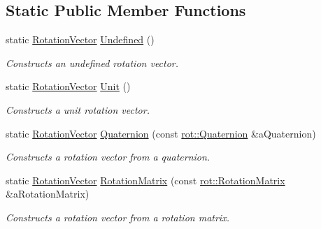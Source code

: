 \subsection*{Static Public Member Functions}
\begin{DoxyCompactItemize}
\item 
static \hyperlink{classlibrary_1_1math_1_1geom_1_1trf_1_1rot_1_1_rotation_vector}{Rotation\+Vector} \hyperlink{classlibrary_1_1math_1_1geom_1_1trf_1_1rot_1_1_rotation_vector_a2641dcca56e633f5639bbcb9dcb02fa2}{Undefined} ()
\begin{DoxyCompactList}\small\item\em Constructs an undefined rotation vector. \end{DoxyCompactList}\item 
static \hyperlink{classlibrary_1_1math_1_1geom_1_1trf_1_1rot_1_1_rotation_vector}{Rotation\+Vector} \hyperlink{classlibrary_1_1math_1_1geom_1_1trf_1_1rot_1_1_rotation_vector_a6dd13d867fa6080a5d45be164ce30c9b}{Unit} ()
\begin{DoxyCompactList}\small\item\em Constructs a unit rotation vector. \end{DoxyCompactList}\item 
static \hyperlink{classlibrary_1_1math_1_1geom_1_1trf_1_1rot_1_1_rotation_vector}{Rotation\+Vector} \hyperlink{classlibrary_1_1math_1_1geom_1_1trf_1_1rot_1_1_rotation_vector_a63ba12aac718671383516a0adab25aec}{Quaternion} (const \hyperlink{classlibrary_1_1math_1_1geom_1_1trf_1_1rot_1_1_quaternion}{rot\+::\+Quaternion} \&a\+Quaternion)
\begin{DoxyCompactList}\small\item\em Constructs a rotation vector from a quaternion. \end{DoxyCompactList}\item 
static \hyperlink{classlibrary_1_1math_1_1geom_1_1trf_1_1rot_1_1_rotation_vector}{Rotation\+Vector} \hyperlink{classlibrary_1_1math_1_1geom_1_1trf_1_1rot_1_1_rotation_vector_a87fd9cff1e806199ed150569a6e98889}{Rotation\+Matrix} (const \hyperlink{classlibrary_1_1math_1_1geom_1_1trf_1_1rot_1_1_rotation_matrix}{rot\+::\+Rotation\+Matrix} \&a\+Rotation\+Matrix)
\begin{DoxyCompactList}\small\item\em Constructs a rotation vector from a rotation matrix. \end{DoxyCompactList}\end{DoxyCompactItemize}
